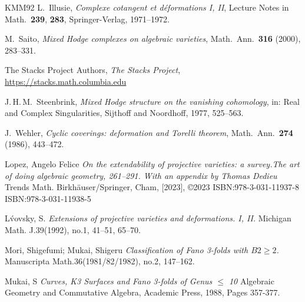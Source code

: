 \documentclass[11pt,twoside]{amsart}
\theoremstyle{plain}
\numberwithin{equation}{section}
\theoremstyle{definition}
\begin{document}
\begin{thebibliography}{KMM92}
 L.~Illusie, \emph{Complexe cotangent et d\'eformations I, II}, Lecture Notes in Math.\ \textbf{239}, \textbf{283}, Springer-Verlag, 1971--1972.
 
 M.~Saito, \emph{Mixed Hodge complexes on algebraic varieties}, Math.\ Ann.\ \textbf{316} (2000), 283--331.

The Stacks Project Authors,
\emph{The Stacks Project},
\url{https://stacks.math.columbia.edu}
 
 J.\,H.\,M.~Steenbrink, \emph{Mixed Hodge structure on the vanishing cohomology}, in: Real and Complex Singularities, Sijthoff and Noordhoff, 1977, 525--563.
 
 J.~Wehler, \emph{Cyclic coverings: deformation and Torelli theorem}, Math.\ Ann.\ \textbf{274} (1986), 443--472.

  












\color{black}



Lopez, Angelo Felice
\emph{On the extendability of projective varieties: a survey.The art of doing algebraic geometry, 261–291. With an appendix by Thomas Dedieu}
Trends Math. Birkhäuser/Springer, Cham, [2023], ©2023 ISBN:978-3-031-11937-8
ISBN:978-3-031-11938-5



L\'vovsky, S.
\emph{Extensions of projective varieties and deformations. I, II.}
Michigan Math. J.39(1992), no.1, 41–51, 65--70.





Mori, Shigefumi; Mukai, Shigeru
\emph{Classification of Fano 3-folds with $B2 \geq 2$.}
Manuscripta Math.36(1981/82/1982), no.2, 147–162.


Mukai, S
\emph{Curves, K3 Surfaces and Fano 3-folds of Genus $\leq$ 10}
Algebraic Geometry and Commutative Algebra, Academic Press,
1988, Pages 357-377.


\end{thebibliography}
\end{document}

